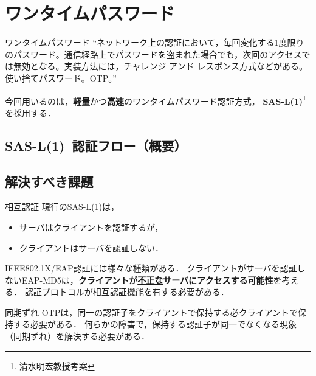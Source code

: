 \section{ワンタイムパスワード}
\toc
\begin{frame}[c]{\fft}
    \begin{block}{ワンタイムパスワード}
        ``ネットワーク上の認証において，毎回変化する1度限りのパスワード。通信経路上でパスワードを盗まれた場合でも，次回のアクセスでは無効となる。実装方法には，チャレンジ アンド レスポンス方式などがある。使い捨てパスワード。OTP。''
    \end{block}
    \vfill
    今回用いるのは，\textbf{軽量}かつ\textbf{高速}のワンタイムパスワード認証方式，\textbf{\color{red} SAS-L(1)}\footnote{清水明宏教授考案}を採用する．
\end{frame}
\subsection{SAS-L(1)\ 認証フロー（概要）}
\begin{frame}{\ft}
    
\end{frame}
\subsection{解決すべき課題}
\begin{frame}[t]{\ft}
    \begin{alertblock}{相互認証\hfill\textbf{}}
        現行のSAS-L(1)は，
        \begin{itemize}
            \item サーバはクライアントを認証するが，
            \item クライアントはサーバを認証しない．
        \end{itemize}
        IEEE802.1X/EAP認証には様々な種類がある．
        クライアントがサーバを認証しないEAP-MD5は，\textbf{クライアントが\underline{不正な}サーバにアクセスする可能性}を考える．
        認証プロトコルが相互認証機能を有する必要がある．
    \end{alertblock}
    \begin{alertblock}{同期ずれ\hfill\textbf{}}
        OTPは，同一の認証子をクライアントで保持する必クライアントで保持する必要がある．
        何らかの障害で，保持する認証子が同一でなくなる現象（同期ずれ）を解決する必要がある．
    \end{alertblock}
\end{frame}
